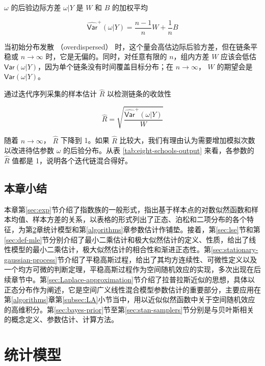 \documentclass[12pt,a4paper,UTF8,twoside]{book}
\theoremstyle{definition}
\theoremstyle{definition}
\theoremstyle{definition}
\theoremstyle{remark}
\begin{document}
\noindent \(\omega\) 的后验边际方差 \(\omega|Y\) 是 \(W\) 和 \(B\)
的加权平均

\begin{equation}
\widehat{\mathsf{Var}}^{+}(\omega|Y) = \frac{n-1}{n} W + \frac{1}{n} B 
\end{equation}

当初始分布发散 （overdispersed）
时，这个量会高估边际后验方差，但在链条平稳或 \(n \to \infty\)
时，它是无偏的。同时，对任意有限的 \(n\)，组内方差 \(W\) 应该会低估
\(\mathsf{Var}(\omega|Y)\)，因为单个链条没有时间覆盖目标分布；在
\(n \to \infty\)， \(W\) 的期望会是 \(\mathsf{Var}(\omega|Y)\)。

通过迭代序列采集的样本估计 \(\hat{R}\) 以检测链条的收敛性

\begin{equation}
\hat{R} = \sqrt{\frac{\widehat{\mathsf{Var}}^{+}(\omega|Y)}{W}}
\end{equation}

\noindent 随着 \(n \to \infty\)， \(\hat{R}\) 下降到 1。如果 \(\hat{R}\)
比较大，我们有理由认为需要增加模拟次数以改进待估参数 \(\omega\)
的后验分布。从表 \ref{tab:eight-schools-output} 来看，各参数的
\(\hat{R}\) 值都是 1，说明各个迭代链混合得好。

\hypertarget{sec:foundations}{%
\section{本章小结}\label{sec:foundations}}

本章第\ref{sec:exp}节介绍了指数族的一般形式，指出基于样本点的对数似然函数和样本均值、样本方差的关系，以表格的形式列出了正态、泊松和二项分布的各个特征，为第\ref{models}章统计模型和第\ref{algorithms}章参数估计作铺垫。接着，第\ref{sec:lse}节和第\ref{sec:def-mle}节分别介绍了最小二乘估计和极大似然估计的定义、性质，给出了线性模型的最小二乘估计，极大似然估计的相合性和渐进正态性。第\ref{sec:stationary-gaussian-process}节介绍了平稳高斯过程，给出了其均方连续性、可微性定义以及一个均方可微的判断定理，平稳高斯过程作为空间随机效应的实现，多次出现在后续章节中。第\ref{sec:Laplace-approximation}节介绍了拉普拉斯近似的思想，具体以正态分布作为阐述，它是空间广义线性混合模型参数估计的重要部分，主要应用在第\ref{algorithms}章第\ref{subsec:LA}小节当中，用以近似似然函数中关于空间随机效应的高维积分。第\ref{sec:bayes-prior}节至第\ref{sec:stan-samplers}节分别是与贝叶斯相关的概念定义、参数估计、计算方法。

\hypertarget{models}{%
\chapter{统计模型}\label{models}}
\end{document}
